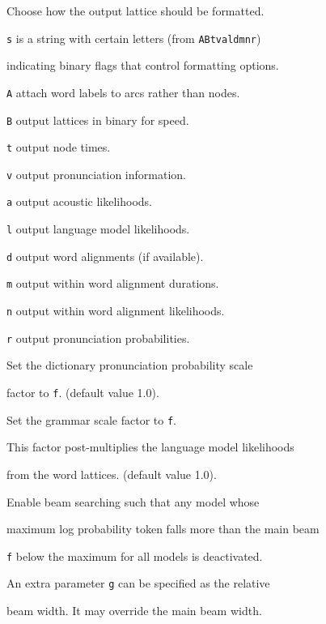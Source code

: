 \begin{optlist}
   Choose how the output lattice should be formatted.


         \texttt{s} is a string with certain letters (from \texttt{ABtvaldmnr})


         indicating binary flags that control formatting options.


         \texttt{A} attach word labels to arcs rather than nodes.


         \texttt{B} output lattices in binary for speed.


         \texttt{t} output node times.


         \texttt{v} output pronunciation information.


         \texttt{a} output acoustic likelihoods.


         \texttt{l} output language model likelihoods.


         \texttt{d} output word alignments (if available).


         \texttt{m} output within word alignment durations.


         \texttt{n} output within word alignment likelihoods.


         \texttt{r} output pronunciation probabilities.





   Set the dictionary pronunciation probability scale 


        factor to \texttt{f}. (default value 1.0).





   Set the grammar scale factor to \texttt{f}.


        This factor post-multiplies the language model likelihoods


        from the word lattices.  (default value 1.0).


 


   Enable beam searching such that any model whose 


        maximum log probability token falls more than the main beam


        \texttt{f} below the maximum for all models is deactivated. 


        An extra parameter \texttt{g} can be specified as the relative 


        beam width. It may override the main beam width.






\end{optlist}
